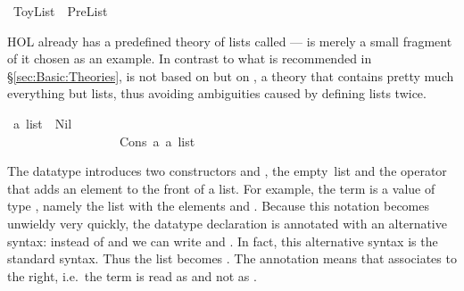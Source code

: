 %
\begin{isabellebody}%
\def\isabellecontext{ToyList}%
\ ToyList\ {\isacharequal}\ PreList{\isacharcolon}%
\begin{isamarkuptext}%
\noindent
HOL already has a predefined theory of lists called  ---
 is merely a small fragment of it chosen as an example. In
contrast to what is recommended in \S\ref{sec:Basic:Theories},
 is not based on  but on , a
theory that contains pretty much everything but lists, thus avoiding
ambiguities caused by defining lists twice.%
\end{isamarkuptext}%
\ {\isacharprime}a\ list\ {\isacharequal}\ Nil\ \ \ \ \ \ \ \ \ \ \ \ \ \ \ \ \ \ \ \ \ \ \ \ \ \ {\isacharparenleft}{\isachardoublequote}{\isacharbrackleft}{\isacharbrackright}{\isachardoublequote}{\isacharparenright}\isanewline
\ \ \ \ \ \ \ \ \ \ \ \ \ \ \ \ \ {\isacharbar}\ Cons\ {\isacharprime}a\ {\isachardoublequote}{\isacharprime}a\ list{\isachardoublequote}\ \ \ \ \ \ \ \ \ \ \ \ {\isacharparenleft}\ {\isachardoublequote}{\isacharhash}{\isachardoublequote}\ {}{}{\isacharparenright}%
\begin{isamarkuptext}%
\noindent
The datatype  introduces two
constructors  and , the
empty~list and the operator that adds an element to the front of a list. For
example, the term  is a value of
type , namely the list with the elements  and
. Because this notation becomes unwieldy very quickly, the
datatype declaration is annotated with an alternative syntax: instead of
 and  we can write
\isa{{\isacharbrackleft}{\isacharbrackright}} and
. In fact, this
alternative syntax is the standard syntax. Thus the list  becomes . The annotation
 means that \isa{{\isacharhash}} associates to
the right, i.e.\ the term  is read as 
and not as .


\end{isamarkuptext}
\end{isabellebody}
